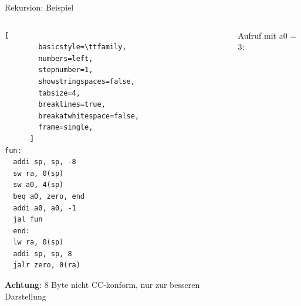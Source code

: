 \documentclass[
  german,            %
  aspectratio=169,    %
]{tumbeamer}
\begin{document}
\begin{frame}[c, fragile]{Rekursion: Beispiel}{}
  \begin{columns}[c]
    \begin{column}{0.4\textwidth}
      \begin{lstlisting}[
        basicstyle=\ttfamily,
        numbers=left,
        stepnumber=1,
        showstringspaces=false,
        tabsize=4,
        breaklines=true,
        breakatwhitespace=false,
        frame=single,
      ]
fun:
  addi sp, sp, -8
  sw ra, 0(sp)
  sw a0, 4(sp)
  beq a0, zero, end
  addi a0, a0, -1
  jal fun
  end:
  lw ra, 0(sp)
  addi sp, sp, 8
  jalr zero, 0(ra)
      \end{lstlisting}
      \small \textbf{Achtung}: 8 Byte nicht CC-konform, nur zur besseren Darstellung
    \end{column}
    \begin{column}{0.5\textwidth}
      Aufruf mit {\ttfamily a0 = 3}:
      \vspace{2cm}
    \end{column}
  \end{columns}
\end{frame}
\end{document}
